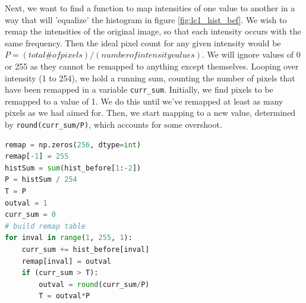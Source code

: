 \documentclass[11pt,a4paper]{article}
\begin{document}
Next, we want to find a function to map intensities of one value to another in a way that will 'equalize' the histogram in figure \ref{fig:lc1_hist_bef}.
We wish to remap the intensities of the original image, so that each intensity occurs with the same frequency. Then the ideal pixel count for any given intensity would be $P = (total \# of pixels) / (number of intensity values)$. We will ignore values of 0 or 255 as they cannot be remapped to anything except themselves. Looping over intensity (1 to 254), we hold a running sum, counting the number of pixels that have been remapped in a variable \verb|curr_sum|. Initially, we find pixels to be remapped to a value of 1. We do this until we've remapped at least as many pixels as we had aimed for. Then, we start mapping to a new value, determined by \verb|round(curr_sum/P)|, which accounts for some overshoot.

\begin{lstlisting}[language=Python]
remap = np.zeros(256, dtype=int)
remap[-1] = 255
histSum = sum(hist_before[1:-2])
P = histSum / 254
T = P
outval = 1
curr_sum = 0
# build remap table
for inval in range(1, 255, 1):
    curr_sum += hist_before[inval]
    remap[inval] = outval
    if (curr_sum > T):
        outval = round(curr_sum/P)
        T = outval*P
\end{lstlisting}
\end{document}
